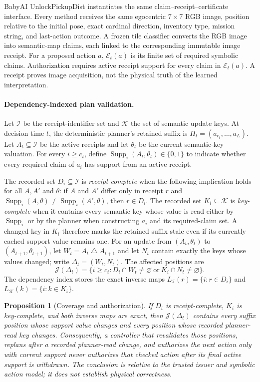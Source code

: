 \documentclass{article}
\newtheorem{proposition}{Proposition}
\begin{document}
BabyAI UnlockPickupDist \citep{chevalierboisvert2023minigrid} instantiates the
same claim--receipt--certificate interface. Every method receives the same
egocentric $7\times7$ RGB image, position relative to the initial pose, exact
cardinal direction, inventory type, mission string, and last-action outcome. A
frozen tile classifier converts the RGB image into semantic-map claims, each
linked to the corresponding immutable image receipt. For a proposed action
$a$, $\mathcal E_t(a)$ is its finite set of required symbolic claims.
Authorization requires active receipt support for every claim in
$\mathcal E_t(a)$. A receipt proves image acquisition, not the physical truth
of the learned interpretation.


\paragraph{Dependency-indexed plan validation.}
Let $\mathcal I$ be the receipt-identifier set and $\mathcal K$ the set of
semantic update keys.  At decision time $t$, the deterministic planner's
retained suffix is $\Pi_t=(a_{c_t},\ldots,a_L)$.  Let $A_t\subseteq\mathcal I$
be the active receipts and let $\theta_t$ be the current semantic-key valuation.
For every $i\ge c_t$, define
$\operatorname{Supp}_i(A_t,\theta_t)\in\{0,1\}$ to indicate whether every
required claim of $a_i$ has support from an active receipt.

The recorded set $D_i\subseteq\mathcal I$ is \emph{receipt-complete} when the
following implication holds for all $A,A'$ and $\theta$: if $A$ and $A'$ differ
only in receipt $r$ and $\operatorname{Supp}_i(A,\theta)\ne
\operatorname{Supp}_i(A',\theta)$, then $r\in D_i$. The recorded set
$K_i\subseteq\mathcal K$ is \emph{key-complete} when it contains every
semantic key whose value is read either by $\operatorname{Supp}_i$ or by the
planner when constructing $a_i$ and its required-claim set. A changed key in
$K_i$ therefore marks the retained suffix stale even if its currently cached
support value remains one.
For an update from $(A_t,\theta_t)$ to $(A_{t+1},\theta_{t+1})$, let
$W_t=A_t\mathbin{\triangle}A_{t+1}$ and let $N_t$ contain exactly the keys
whose values changed; write $\Delta_t=(W_t,N_t)$. The affected positions are
\[
 \mathcal J(\Delta_t)=\{i\ge c_t:D_i\cap W_t\ne\varnothing
 \ \text{or}\ K_i\cap N_t\ne\varnothing\}.
\]
The dependency index stores the exact inverse maps
$L_{\mathcal I}(r)=\{i:r\in D_i\}$ and
$L_{\mathcal K}(k)=\{i:k\in K_i\}$.

\begin{proposition}[Coverage and authorization]\label{prop:receipt-support}
If $D_i$ is receipt-complete, $K_i$ is key-complete, and both inverse maps are
exact, then $\mathcal J(\Delta_t)$ contains every suffix position whose support
value changes and every position whose recorded planner-read key changes.
Consequently, a controller that revalidates those positions, replans after a
recorded planner-read change, and authorizes the next action only with current
support never authorizes that checked action after its final active support is
withdrawn. The conclusion is relative to the trusted issuer and symbolic
action model; it does not establish physical correctness.
\end{proposition}
\end{document}

